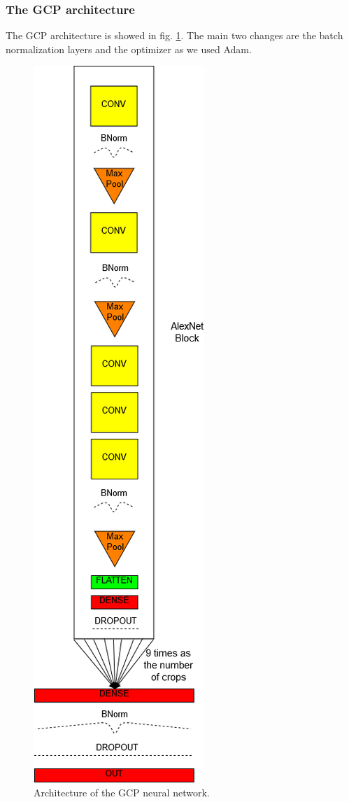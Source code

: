 \subsubsection{The GCP architecture}\label{sss:GCP_arch}
The GCP architecture is showed in fig. \ref{fig:GCP_net}. The main two changes are the batch normalization layers and the optimizer as we used Adam.
\begin{figure}[!ht]
    \centering
    \includegraphics[scale=0.45]{images/GCP_net.png}
    \caption{Architecture of the GCP neural network.}
    \label{fig:GCP_net}
\end{figure}
